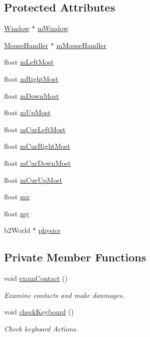 \subsection*{Protected Attributes}
\begin{DoxyCompactItemize}
\item 
\hyperlink{classWindow}{Window} $\ast$ \hyperlink{classWorld_a9e60dc10845f02ed5866182140069be1}{m\+Window}
\item 
\hyperlink{classMouseHandler}{Mouse\+Handler} $\ast$ \hyperlink{classWorld_a9bab67b954d8de400ec06b07fa88c22b}{m\+Mouse\+Handler}
\item 
float \hyperlink{classWorld_aeecec3f91f92f263de2eadcb5a87fabd}{m\+Left\+Most}
\item 
float \hyperlink{classWorld_a2faeb13aa9c7217552654b2292e50f6a}{m\+Right\+Most}
\item 
float \hyperlink{classWorld_ab643703f63f5c3f8976d1a36b4ca9308}{m\+Down\+Most}
\item 
float \hyperlink{classWorld_a339db81bbb99ccf53f3cac5e9763d024}{m\+Up\+Most}
\item 
float \hyperlink{classWorld_ac0a6a277c98bb22fbb5fd8c8b30da604}{m\+Cur\+Left\+Most}
\item 
float \hyperlink{classWorld_aa4304f0ded86d76a21f4fdaaa56ad382}{m\+Cur\+Right\+Most}
\item 
float \hyperlink{classWorld_a6c703fe8401bc1516dd6e8c474a8a74f}{m\+Cur\+Down\+Most}
\item 
float \hyperlink{classWorld_a657ccdad21b3984bf8c8837f500ac45e}{m\+Cur\+Up\+Most}
\item 
float \hyperlink{classWorld_a3a9816094376a49c55d2ba878ad33271}{mx}
\item 
float \hyperlink{classWorld_a3ef0e1ad2396eab18e18684f11d91529}{my}
\item 
b2\+World $\ast$ \hyperlink{classWorld_a99f3098ee94a83726a1ea67ea515417f}{physics}
\end{DoxyCompactItemize}
\subsection*{Private Member Functions}
\begin{DoxyCompactItemize}
\item 
void \hyperlink{classWorld_a3979ccd68086a0954040665845c3cd1c}{exam\+Contact} ()
\begin{DoxyCompactList}\small\item\em Examine contacts and make danmages. \end{DoxyCompactList}\item 
void \hyperlink{classWorld_a1b4130ee5a4f36a6dbc13767489aef08}{check\+Keyboard} ()
\begin{DoxyCompactList}\small\item\em Check keyboard Actions. \end{DoxyCompactList}\end{DoxyCompactItemize}
